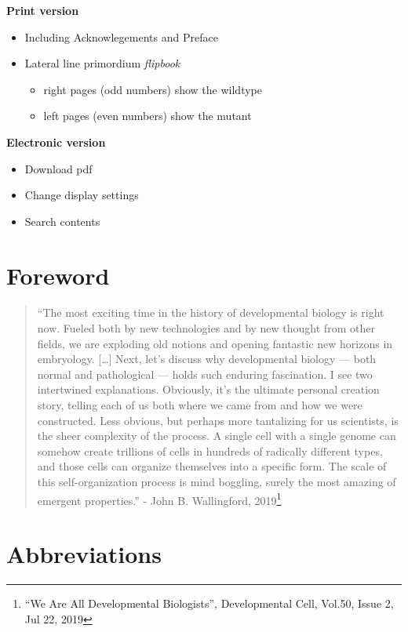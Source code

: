 \documentclass[11pt,singlespacinge,twoside]{reedthesis} %
\providecommand{\tightlist}{%
  \setlength{\itemsep}{0pt}\setlength{\parskip}{0pt}}
\theoremstyle{definition}
\theoremstyle{definition}
\theoremstyle{definition}
\theoremstyle{remark}
\begin{document}
\noindent \textbf{Print version}
\begin{itemize}
\tightlist
\item
  Including Acknowlegements and Preface
\item
  Lateral line primordium \emph{flipbook}
  \begin{itemize}
  \tightlist
  \item
    right pages (odd numbers) show the wildtype
  \item
    left pages (even numbers) show the mutant
  \end{itemize}
\end{itemize}
\noindent \textbf{Electronic version}
\begin{itemize}
\tightlist
\item
  Download pdf
\item
  Change display settings
\item
  Search contents
\end{itemize}
\newpage

\hypertarget{foreword}{%
\section*{Foreword}\label{foreword}}

\vspace{1cm}
\begin{quote}
``The most exciting time in the history of developmental biology is right now. Fueled both by new technologies and by new thought from other fields, we are exploding old notions and opening fantastic new horizons in embryology. {[}\ldots{]}
Next, let's discuss why developmental biology --- both normal and pathological --- holds such enduring fascination. I see two intertwined explanations. Obviously, it's the ultimate personal creation story, telling each of us both where we came from and how we were constructed. Less obvious, but perhaps more tantalizing for us scientists, is the sheer complexity of the process. A single cell with a single genome can somehow create trillions of cells in hundreds of radically different types, and those cells can organize themselves into a specific form. The scale of this self-organization process is mind boggling, surely the most amazing of emergent properties.''
- John B. Wallingford, 2019\footnote{``We Are All Developmental Biologists'', Developmental Cell, Vol.50, Issue 2, Jul 22, 2019}
\end{quote}
\hypertarget{abbreviations}{%
\section*{Abbreviations}\label{abbreviations}}
\end{document}
